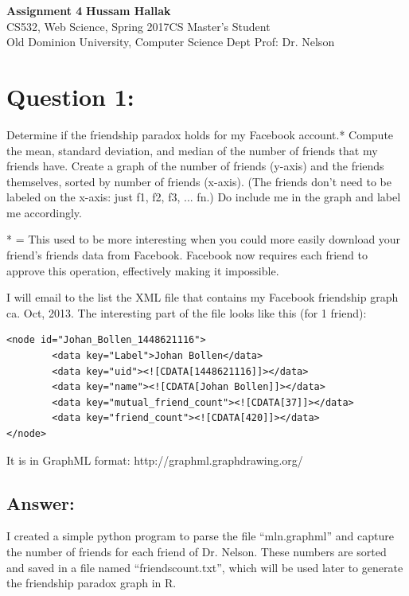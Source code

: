 \documentclass[a4paper, 11pt]{article}
\begin{document}
\noindent
\large\textbf{Assignment 4} \hfill \textbf{Hussam Hallak} \\
\normalsize CS532, Web Science, Spring 2017\hfill CS Master's Student \\
Old Dominion University, Computer Science Dept \hfill Prof: Dr. Nelson 

\section*{Question 1:}
Determine if the friendship paradox holds for my Facebook
account.* Compute the mean, standard deviation, and median of the
number of friends that my friends have.  Create a graph of the
number of friends (y-axis) and the friends themselves, sorted by
number of friends (x-axis).  (The friends don't need to be labeled
on the x-axis: just f1, f2, f3, ... fn.)  Do include me in the graph
and label me accordingly.

* = This used to be more interesting when you could more easily download
your friend's friends data from Facebook.  Facebook now requires each
friend to approve this operation, effectively making it impossible.

I will email to the list the XML file that contains my Facebook
friendship graph ca. Oct, 2013.  The interesting part of the file looks
like this (for 1 friend):

\begin{lstlisting}
<node id="Johan_Bollen_1448621116">
        <data key="Label">Johan Bollen</data>
        <data key="uid"><![CDATA[1448621116]]></data>
        <data key="name"><![CDATA[Johan Bollen]]></data>
        <data key="mutual_friend_count"><![CDATA[37]]></data>
        <data key="friend_count"><![CDATA[420]]></data>
</node>
\end{lstlisting}

It is in GraphML format: http://graphml.graphdrawing.org/


\subsection*{Answer:}
I created a simple python program to parse the file ``mln.graphml'' and capture the number of friends for each friend of Dr. Nelson. These numbers are sorted and saved in a file named ``friendscount.txt'', which will be used later to generate the friendship paradox graph in R.


\end{document}
